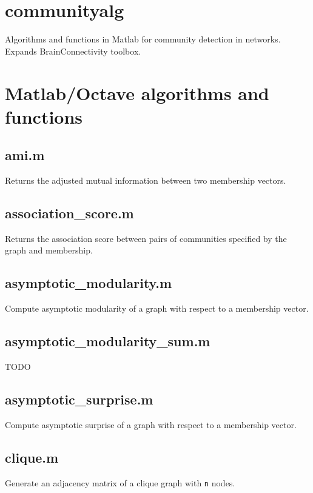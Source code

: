 \section{communityalg}\label{communityalg}

Algorithms and functions in Matlab for community detection in networks.
Expands BrainConnectivity toolbox.

\section{Matlab/Octave algorithms and
functions}\label{matlaboctave-algorithms-and-functions}

\begin{itemize}[<+->]
\tightlist

  \subsection*{ami.m} Returns the adjusted mutual information between two
  membership vectors.

  \subsection*{association\_score.m} Returns the association score between
  pairs of communities specified by the graph and membership.

  \subsection*{asymptotic\_modularity.m} Compute asymptotic modularity of a
  graph with respect to a membership vector.

  \subsection*{asymptotic\_modularity\_sum.m} TODO

  \subsection*{asymptotic\_surprise.m} Compute asymptotic surprise of a graph
  with respect to a membership vector.

  \subsection*{clique.m} Generate an adjacency matrix of a clique graph with
  \texttt{n} nodes.


\end{itemize}

